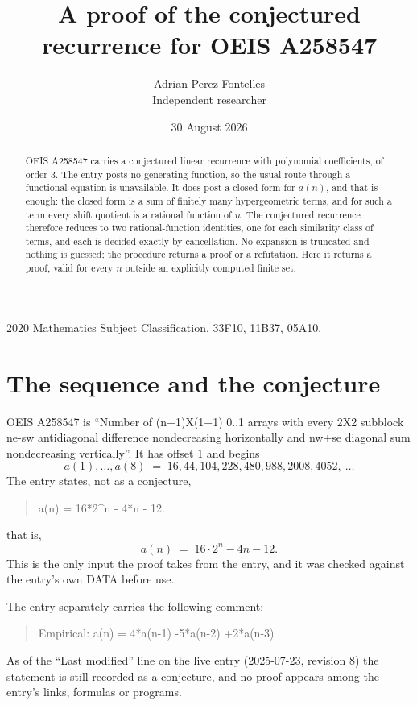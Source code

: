 \documentclass[11pt,a4paper]{article}
\title{A proof of the conjectured recurrence for OEIS A258547}
\author{Adrian Perez Fontelles\\ \small Independent researcher}
\date{30 August 2026}
\theoremstyle{plain}
\theoremstyle{definition}
\begin{document}
\maketitle

\begin{abstract}
OEIS A258547 carries a conjectured linear recurrence with polynomial coefficients, of
order 3. The entry posts no generating function, so the usual route through a
functional equation is unavailable. It does post a closed form for $a(n)$, and that is
enough: the closed form is a sum of finitely many hypergeometric terms, and for such a
term every shift quotient is a rational function of $n$. The conjectured recurrence
therefore reduces to two rational-function identities, one for each similarity
class of terms, and each is decided exactly by cancellation. No expansion is truncated and
nothing is guessed; the procedure returns a proof or a refutation. Here it returns a proof,
valid for every $n$ outside an explicitly computed finite set.
\end{abstract}

\noindent\small 2020 Mathematics Subject Classification. 33F10, 11B37, 05A10.\normalsize

\section{The sequence and the conjecture}

OEIS A258547 is ``Number of (n+1)X(1+1) 0..1 arrays with every 2X2 subblock ne-sw antidiagonal difference nondecreasing horizontally and nw+se diagonal sum nondecreasing vertically''. It has offset $1$ and begins
\[
a(1),\dots,a(8)\;=\;16, 44, 104, 228, 480, 988, 2008, 4052,\ \dots
\]
The entry states, not as a conjecture,
\begin{quote}\small
a(n) = 16*2\textasciicircum{}n - 4*n - 12.
\end{quote}
that is,
\begin{equation}\label{eq:cf}
a(n)\;=\;16 \cdot 2^{n} - 4 n - 12 .
\end{equation}
This is the only input the proof takes from the entry, and it was checked against the
entry's own DATA before use.

The entry separately carries the following comment:
\begin{quote}\small
Empirical: a(n) = 4*a(n-1) -5*a(n-2) +2*a(n-3)
\end{quote}
As of the ``Last modified'' line on the live entry (2025-07-23, revision 8) the
statement is still recorded as a conjecture, and no proof appears among the entry's links,
formulas or programs.
\end{document}
